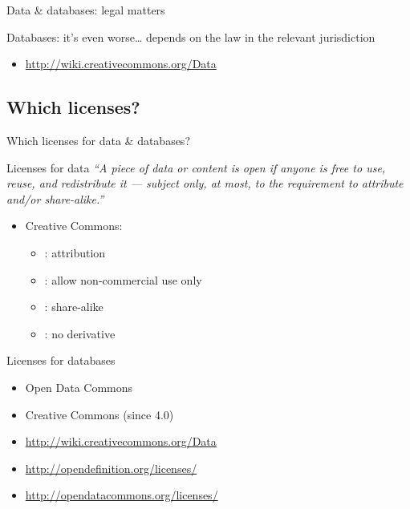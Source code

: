 \documentclass[10pt,xcolor=svgnames]{beamer}
\begin{document}
\begin{frame}{Data \& databases: legal matters}
\begin{overprint}
\begin{block}{Databases: it's even worse\ldots}
      {\scriptsize\empha{*}depends on the law in the relevant jurisdiction}
    \end{block}
  \end{overprint}

    {\scriptsize
    \begin{itemize}
    \item \url{http://wiki.creativecommons.org/Data}
    \end{itemize}
    }

\end{frame}

\subsection{Which licenses?}
\begin{frame}{Which licenses for data \& databases?}

  \begin{block}{Licenses for data}
    {\small\emph{``A piece of data or content is open if anyone is free to use, reuse, and redistribute it — subject only, at most, to the requirement to attribute and/or share-alike.''}}
    \begin{itemize}
      \item Creative Commons:
        \begin{itemize}
          \item {}: attribution
          \item {}: allow non-commercial use only
          \item {}: share-alike
          \item {}: no derivative
        \end{itemize}
    \end{itemize}
    \hspace{-.5em}{\small you can use linear combination of (almost) any of the above (SA \& ND are exclusive)}
  \end{block}

  \begin{block}{Licenses for databases}
    \begin{itemize}
      \item Open Data Commons
      \item Creative Commons (since 4.0)
    \end{itemize}
  \end{block}

    {\scriptsize
    \begin{itemize}
    \item \url{http://wiki.creativecommons.org/Data}
    \item \url{http://opendefinition.org/licenses/}
    \item \url{http://opendatacommons.org/licenses/}
    \end{itemize}
    }

\end{frame}
\end{document}
